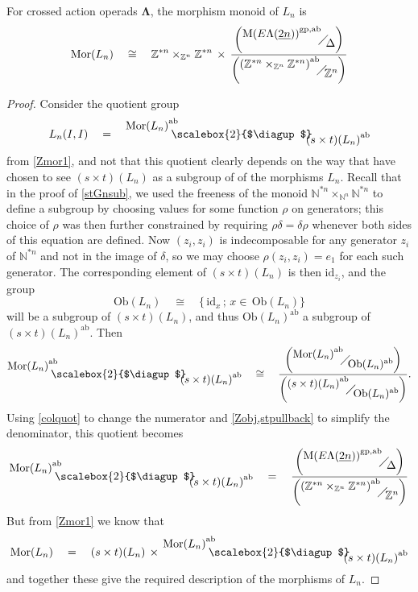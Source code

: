 \documentclass{amsbook} %
\newcommand{\ML}{\mathbf{\Lambda}}
\newcommand{\quotient}[2]{ \raisebox{0.5\height}{$#1$} \mkern-5mu\diagup\mkern-4mu \raisebox{-0.5\height}{$#2$} }
\newcommand{\bigquotient}[2]{ \raisebox{0.75\height}{$#1$} \mkern-12mu\scalebox{2}{$\diagup$}\mkern-10mu \raisebox{-0.5\height}{$#2$} }
\newcommand{\ELnn}{E\Lambda(\underline{2n})}
\numberwithin{section}{chapter}
\begin{document}
\begin{prop} \label{Zmor} For crossed action operads $\ML$, the morphism monoid of $L_n$ is 
\[ \mathrm{Mor}(L_n) \quad \cong \quad \mathbb{Z}^{\ast n} \times_{\mathbb{Z}^n} \mathbb{Z}^{\ast n}  \, \times \, \frac{\left(\quotient{{\mathrm{M}(\ELnn)}^{\mathrm{gp},\mathrm{ab}}}{\Delta}\right)}{\left(\quotient{{(\mathbb{Z}^{\ast n} \times_{\mathbb{Z}^n} \mathbb{Z}^{\ast n})}^{\mathrm{ab}}}{\mathbb{Z}^n}\right)} \]
\end{prop}
\begin{proof}
Consider the quotient group
\[ L_n(I,I) \quad = \quad \bigquotient{{\mathrm{Mor}(L_n)}^{\mathrm{ab}}}{{(s \times t)(L_n)}^{\mathrm{ab}}} \]
from \cref{Zmor1}, and not that this quotient clearly depends on the way that have chosen to see $(s \times t)(L_n)$ as a subgroup of of the morphisms $L_n$. Recall that  in the proof of \cref{stGnsub}, we used the freeness of the monoid $\mathbb{N}^{\ast n} \times_{\mathbb{N}^n} \mathbb{N}^{\ast n}$ to define a subgroup by choosing values for some function $\rho$ on generators; this choice of $\rho$ was then further constrained by requiring $\rho \delta = \delta \rho$ whenever both sides of this equation are defined. Now $(z_i, z_i)$ is indecomposable for any generator $z_i$ of $\mathbb{N}^{*n}$ and not in the image of $\delta$, so we may choose $\rho(z_i, z_i) = e_1$ for each such generator. The corresponding element of $(s \times t)(L_n)$ is then $\mathrm{id}_{z_i}$, and the group
\[ \mathrm{Ob}(L_n) \quad \cong \quad \{ \, \mathrm{id}_x \, ; \, x \in \, \mathrm{Ob}(L_n) \}\]
will be a subgroup of $(s \times t)(L_n)$, and thus $\mathrm{Ob}(L_n)^{\mathrm{ab}}$ a subgroup of $(s \times t)(L_n)^{\mathrm{ab}}$. Then 
\[ \bigquotient{{\mathrm{Mor}(L_n)}^{\mathrm{ab}}}{{(s \times t)(L_n)}^{\mathrm{ab}}} \quad \cong \quad \frac{\left(\quotient{{\mathrm{Mor}(L_n)}^{\mathrm{ab}}}{\mathrm{Ob}(L_n)^{\mathrm{ab}}}\right)}{\left(\quotient{{(s \times t)(L_n)}^{\mathrm{ab}}}{\mathrm{Ob}(L_n)^{\mathrm{ab}}}\right)}. \]
Using \cref{colquot} to change the numerator and \cref{Zobj,stpullback} to simplify the denominator, this quotient becomes
\[ \bigquotient{{\mathrm{Mor}(L_n)}^{\mathrm{ab}}}{{(s \times t)(L_n)}^{\mathrm{ab}}} \quad = \quad \frac{\left(\quotient{{\mathrm{M}(\ELnn)}^{\mathrm{gp},\mathrm{ab}}}{\Delta}\right)}{\left(\quotient{{(\mathbb{Z}^{\ast n} \times_{\mathbb{Z}^n} \mathbb{Z}^{\ast n})}^{\mathrm{ab}}}{\mathbb{Z}^n}\right)} \]
But from \cref{Zmor1} we know that
\[ \mathrm{Mor}(L_n) \quad = \quad (s \times t)(L_n) \, \times \, \bigquotient{{\mathrm{Mor}(L_n)}^{\mathrm{ab}}}{{(s \times t)(L_n)}^{\mathrm{ab}}} \]
and together these give the required description of the morphisms of $L_n$.




\end{proof}
\end{document}
